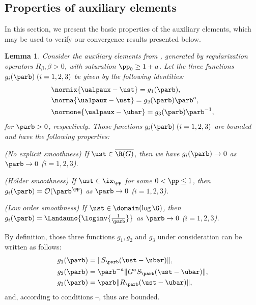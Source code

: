 \documentclass[10pt]{article}
\newtheorem{lemma}[theorem]{Lemma}
\theoremstyle{definition}
\begin{document}
\subsection{Properties of auxiliary elements}
\label{auxels}
%
In this section, we present the basic properties of the auxiliary elements, which may be used to verify our convergence results presented below.
%
%
%
\begin{lemma}
\label{th:auxel_1}
Consider the auxiliary elements from ,
generated by regularization operators $ R_\beta, \beta > 0 $, with saturation
$ \pp_0 \ge 1 + a $.
Let the three functions $g_i(\parb)\;(i=1,2,3)$ be given by the following identities:
%
\begin{align}
& \normix{\ualpaux - \ust}=g_1(\parb),
\label{eq:auxel-a}
\\
& \norma{\ualpaux - \ust} = g_2(\parb)\parb^{a},
\label{eq:auxel-b}
\\
& \normone{\ualpaux-\ubar} = g_3(\parb)\parb^{-1},
\label{eq:auxel-c}
\end{align}
%
for $ \parb > 0 $, respectively. Those functions $g_i(\parb)\;(i=1,2,3)$  are bounded and have the following properties:
%
\begin{mylist_indent}
\item (No explicit smoothness) If
$ \ust \in \overline{\R(G)} $, then we have $ g_i(\parb) \to 0 $ as $ \parb \to 0 $ ($i=1,2,3$).
\item (H\"older smoothness)
If $ \ust \in \ix_\pp $ for some $ 0 < \pp \le 1 $,
then
$ g_i(\parb)=\mathcal{O}(\parb^\pp) $ as $ \parb \to 0 $ ($i=1,2,3$).
\item (Low order smoothness)
If $ \ust \in \domain(\log \G) $,
then
$ g_i(\parb)= \Landauno{\loginv{\frac{1}{\parb}}} $
as $ \parb \to 0 $ ($i=1,2,3$).
\end{mylist_indent}
\end{lemma}
%
\proof
By definition, those three functions $ g_1, g_2 $ and $ g_3 $ under consideration can
be written as follows:
%
\begin{align*}
g_1(\parb) &= \| S_\parb (\ust-\ubar)\|,
\\
g_2(\parb) &=
\parb^{-a} \| G^a S_\parb (\ust-\ubar) \|, \\
%
g_3(\parb) &=
\parb \| R_\parb (\ust - \ubar) \|,
\end{align*}
%
and, according to conditions --,
thus are bounded.
%
\end{document}
